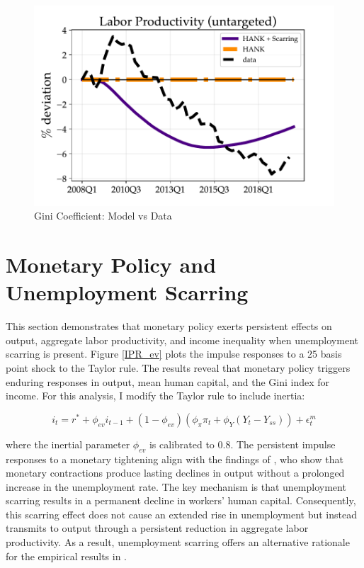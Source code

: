 \begin{figure}[!ht!]
\begin{center}
\includegraphics[scale=0.5]{text/chapter1/Figures/GR_sim/labor_productivity}
\end{center}
\caption{Gini Coefficient: Model vs Data}
 \label{Gini_GR}
\end{figure}





\section{Monetary Policy and Unemployment Scarring}
\label{appendix:MP}

This section demonstrates that monetary policy exerts persistent effects on output, aggregate labor productivity, and income inequality when unemployment scarring is present. Figure \ref{IPR_ev} plots the impulse responses to a 25 basis point shock to the Taylor rule. The results reveal that monetary policy triggers enduring responses in output, mean human capital, and the Gini index for income. For this analysis, I modify the Taylor rule to include inertia: 


$$i_{t} = r^{*} + \phi_{ev} i_{t-1} + (1-\phi_{ev})(\phi_{\pi} \pi_{t} + \phi_{Y} (Y_{t} - Y_{ss})) + \epsilon^{m}_{t}$$

where the inertial parameter $\phi_{ev}$ is calibrated to 0.8. The persistent impulse responses to a monetary tightening align with the findings of \cite{Jorda2023}, who show that monetary contractions produce lasting declines in output without a prolonged increase in the unemployment rate. The key mechanism is that unemployment scarring results in a permanent decline in workers' human capital. Consequently, this scarring effect does not cause an extended rise in unemployment but instead transmits to output through a persistent reduction in aggregate labor productivity. As a result, unemployment scarring offers an alternative rationale for the empirical results in \cite{Jorda2023}.





